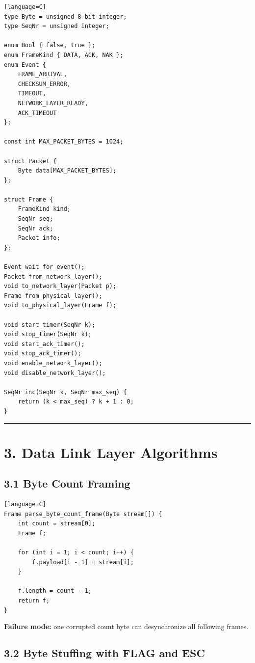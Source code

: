 \documentclass[11pt]{article}
\begin{document}
\begin{verbatim}[language=C]
type Byte = unsigned 8-bit integer;
type SeqNr = unsigned integer;

enum Bool { false, true };
enum FrameKind { DATA, ACK, NAK };
enum Event {
    FRAME_ARRIVAL,
    CHECKSUM_ERROR,
    TIMEOUT,
    NETWORK_LAYER_READY,
    ACK_TIMEOUT
};

const int MAX_PACKET_BYTES = 1024;

struct Packet {
    Byte data[MAX_PACKET_BYTES];
};

struct Frame {
    FrameKind kind;
    SeqNr seq;
    SeqNr ack;
    Packet info;
};

Event wait_for_event();
Packet from_network_layer();
void to_network_layer(Packet p);
Frame from_physical_layer();
void to_physical_layer(Frame f);

void start_timer(SeqNr k);
void stop_timer(SeqNr k);
void start_ack_timer();
void stop_ack_timer();
void enable_network_layer();
void disable_network_layer();

SeqNr inc(SeqNr k, SeqNr max_seq) {
    return (k < max_seq) ? k + 1 : 0;
}
\end{verbatim}

\begin{center}\rule{0.5\linewidth}{0.5pt}\end{center}

\section{3. Data Link Layer
Algorithms}\label{data-link-layer-algorithms}

\subsection{3.1 Byte Count Framing}\label{byte-count-framing}

\begin{verbatim}[language=C]
Frame parse_byte_count_frame(Byte stream[]) {
    int count = stream[0];
    Frame f;

    for (int i = 1; i < count; i++) {
        f.payload[i - 1] = stream[i];
    }

    f.length = count - 1;
    return f;
}
\end{verbatim}

\textbf{Failure mode:} one corrupted count byte can desynchronize all
following frames.

\subsection{3.2 Byte Stuffing with FLAG and
ESC}\label{byte-stuffing-with-flag-and-esc}
\end{document}
